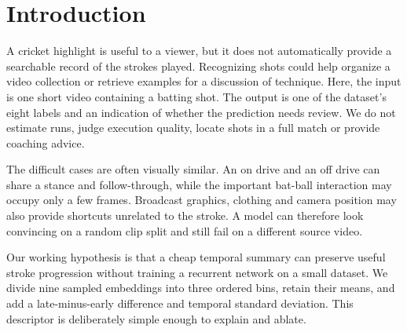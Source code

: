 \begin{abstract}
Recognizing a cricket shot from one frame can be difficult when the bat is blurred or the stroke has not yet developed. We study a small, CPU-only system for classifying trimmed videos into eight shot categories. Our proposed representation combines ordered averages of early, middle and late frame embeddings with their temporal difference and spread. It uses a frozen ImageNet MobileNetV2 encoder and a class-balanced linear classifier. The contribution is a compact, inspectable design and a controlled evaluation of its components, rather than a new backbone or a claim of state-of-the-art performance. We evaluate {{N}} real clips with source groups kept disjoint across training, validation and test sets. The proposed model obtains {{ACC}}\% accuracy and {{F1}}\% macro F1 on {{TEST_N}} held-out clips, compared with {{MID_ACC}}\% and {{MID_F1}}\% for a middle-frame baseline. {{ABSTRACT_FINDING}} The local demo shows the sampled sequence, all class scores and a validation-chosen review decision. Results and limitations are supported by saved predictions and reproducible code.
\end{abstract}

\section{Introduction}
A cricket highlight is useful to a viewer, but it does not automatically provide a searchable record of the strokes played. Recognizing shots could help organize a video collection or retrieve examples for a discussion of technique. Here, the input is one short video containing a batting shot. The output is one of the dataset's eight labels and an indication of whether the prediction needs review. We do not estimate runs, judge execution quality, locate shots in a full match or provide coaching advice.

The difficult cases are often visually similar. An on drive and an off drive can share a stance and follow-through, while the important bat-ball interaction may occupy only a few frames. Broadcast graphics, clothing and camera position may also provide shortcuts unrelated to the stroke. A model can therefore look convincing on a random clip split and still fail on a different source video.

Our working hypothesis is that a cheap temporal summary can preserve useful stroke progression without training a recurrent network on a small dataset. We divide nine sampled embeddings into three ordered bins, retain their means, and add a late-minus-early difference and temporal standard deviation. This descriptor is deliberately simple enough to explain and ablate.

